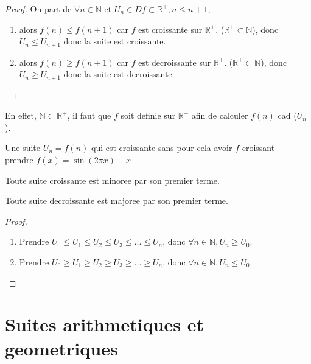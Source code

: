 \documentclass[a4paper,10pt]{book}
\begin{document}
			\smallskip

			\begin{proof}
				On part de $\forall n \in \mathbb{N}$ et $U_n \in Df \subset \mathbb{R}^+, n \leq n+1$,
				\begin{enumerate}
					\item alors $f(n) \leq f(n+1)$ car $f$ est croissante sur $\mathbb{R}^+$. ($\mathbb{R}^+ \subset \mathbb{N}$), donc $U_n \leq U_{n+1}$ donc la suite est croissante.
					\item alors $f(n) \geq f(n+1)$ car $f$ est decroissante sur $\mathbb{R}^+$. ($\mathbb{R}^+ \subset \mathbb{N}$), donc $U_n \geq U_{n+1}$ donc la suite est decroissante.
				\end{enumerate}
			\end{proof}

			\begin{rem}
				En effet, $\mathbb{N} \subset \mathbb{R}^+$, il faut que $f$ soit definie sur $\mathbb{R}^+$ afin de calculer $f(n)$ cad ($U_n$).
			\end{rem}

			\exemple Une suite $U_n = f(n)$ qui est croissante sans pour cela avoir $f$ croissant \\prendre $f(x) = \sin{(2\pi x)} + x$

			\begin{prop}
				\begin{description}
					\item Toute suite croissante est minoree par son premier terme.
					\item Toute suite decroissante est majoree par son premier terme.
				\end{description}
			\end{prop}

			\begin{proof}
				\begin{enumerate}
					\item Prendre $U_0 \leq U_1 \leq U_2 \leq U_3 \leq ... \leq U_n$, donc $\forall n \in \mathbb{N}, U_n \geq U_0$.
					\item Prendre $U_0 \geq U_1 \geq U_2 \geq U_3 \geq ... \geq U_n$, donc $\forall n \in \mathbb{N}, U_n \leq U_0$.
				\end{enumerate}
			\end{proof}

			\section{Suites arithmetiques et geometriques}
\end{document}
